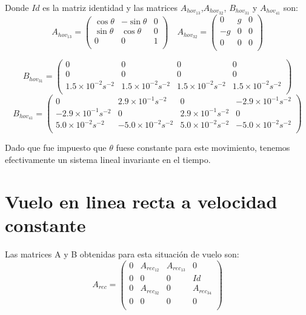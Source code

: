 Donde $Id$ es la matriz identidad y las matrices $A_{hov_{13}}$,$A_{hov_{32}}$, $B_{hov_{31}}$ y $A_{hov_{41}}$ son:
\begin{equation}
A_{hov_{13}}=\left(\begin{array}{ccc}
\cos\theta & -\sin\theta & 0 \\
\sin\theta & \cos\theta & 0\\
0 & 0 &1\\
\end{array}\right) \quad 
A_{hov_{32}}=\left(\begin{array}{ccc}
0 & g & 0 \\
-g & 0 & 0\\
0 & 0 &0\\
\end{array}\right)
\end{equation}


\begin{equation}
B_{hov_{31}}=\left(\begin{array}{cccc}
0&0&0&0\\
0&0&0&0\\
1.5\times10^{-2}s^{-2} &1.5\times10^{-2}s^{-2} & 1.5\times10^{-2}s^{-2}& 1.5\times10^{-2}s^{-2} \\
\end{array}\right) 
\end{equation}
\begin{equation}
B_{hov_{41}}=\left(\begin{array}{cccc}
0 & 2.9\times10^{-1}s^{-2} & 0 &-2.9\times10^{-1}s^{-2} \\
-2.9\times10^{-1}s^{-2} &0& 2.9\times10^{-1}s^{-2} &0\\
5.0\times10^{-2}s^{-2} & -5.0\times10^{-2}s^{-2} &5.0\times10^{-2}s^{-2} &-5.0\times10^{-2}s^{-2}\\
\end{array}\right)
\end{equation}

Dado que fue impuesto que $\theta$ fuese constante para este movimiento, tenemos efectivamente un sistema lineal invariante en el tiempo.

\section{Vuelo en linea recta a velocidad constante}

Las matrices A y B obtenidas para esta situaci\'on de vuelo son:
\begin{equation}
\label{eq:Arec}
A_{rec}=\left(\begin{array}{cccc}
0 & A_{rec_{12}} & A_{rec_{13}} & 0 \\
0 & 0 & 0      & Id\\
0 & A_{rec_{32}} & 0 & A_{rec_{34}}\\
0 & 0      & 0 & 0 \\    
\end{array}\right)
\end{equation}\\


